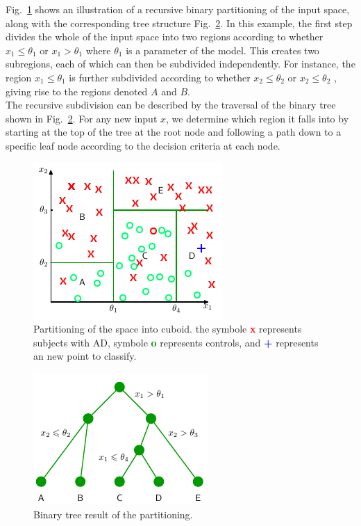 \documentclass[final, paper=letter,5p,times,twocolumn]{elsarticle}
\begin{document}
Fig.~\ref{fig:DT_space_cuboid} shows an illustration of a recursive binary partitioning of the input space, along with the corresponding tree structure Fig.~\ref{fig:DT_binary_tree}. In this example, the first step divides the whole of the input space into two regions according to whether $x_{1} \le \theta_{1}$ or $x_{1} > \theta_{1}$ where $\theta_{1}$ is a parameter of the model. This creates two subregions, each of which can then be subdivided independently. For instance, the region $x_{1} \le \theta_{1}$ is further subdivided according to whether $x_{2} \le \theta_{2}$ or $x_{2} \le \theta_{2}$ , giving rise to the regions denoted $A$ and $B$.\\
The recursive subdivision can be described by the traversal of the binary tree shown in Fig.~\ref{fig:DT_binary_tree}. For any new input $x$, we determine which region it falls into by starting at the top of the tree at the root node and following a path down to a specific leaf node according to the decision criteria at each node.

\begin{figure}[htbp]
   \begin{center}
      \includegraphics[scale=0.5, angle=0]{images/Decision_tree_space_cuboid_modified.png}
   \end{center}
   \caption{Partitioning of the space into cuboid. the symbole {\bf\textcolor{red}{x}} represents subjects with AD, symbole {\bf\textcolor{green}{o}} represents controls, and {\bf\textcolor{blue}{+}} represents an new point to classify.}
  \label{fig:DT_space_cuboid} 
\end{figure}

\begin{figure}[htbp]
   \begin{center}
      \includegraphics[scale=0.5, angle=0]{images/Decision_tree_binary_tree.png}
   \end{center}
   \caption{Binary tree result of the partitioning.}
  \label{fig:DT_binary_tree} 
\end{figure}
\end{document}
